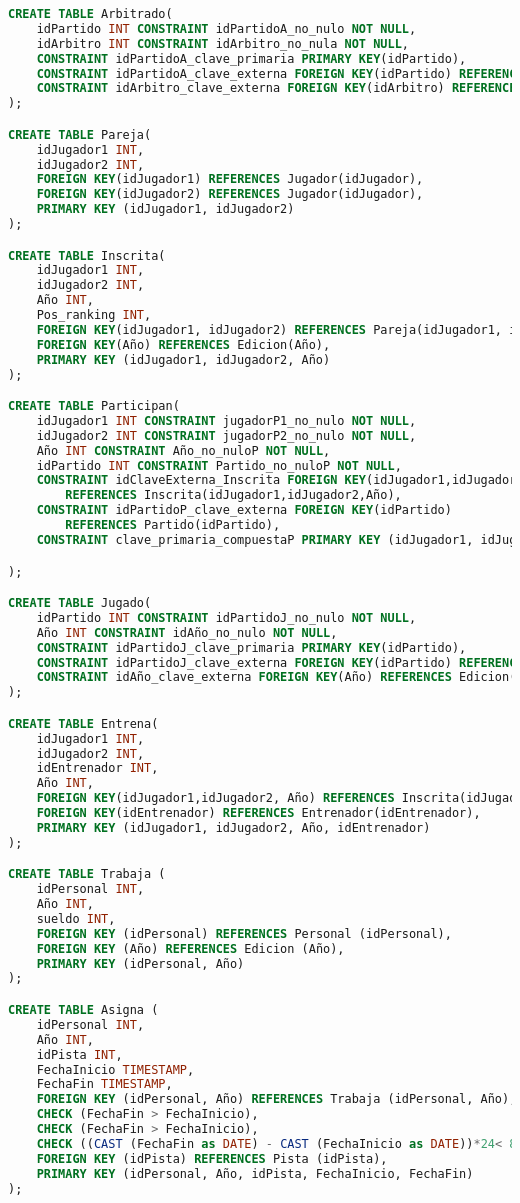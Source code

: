 \begin{lstlisting}[language=sql]
CREATE TABLE Arbitrado(
	idPartido INT CONSTRAINT idPartidoA_no_nulo NOT NULL,
	idArbitro INT CONSTRAINT idArbitro_no_nula NOT NULL,
	CONSTRAINT idPartidoA_clave_primaria PRIMARY KEY(idPartido),
	CONSTRAINT idPartidoA_clave_externa FOREIGN KEY(idPartido) REFERENCES Partido(idPartido),
	CONSTRAINT idArbitro_clave_externa FOREIGN KEY(idArbitro) REFERENCES Arbitro(idArbitro)
);

CREATE TABLE Pareja(
	idJugador1 INT,
	idJugador2 INT,
	FOREIGN KEY(idJugador1) REFERENCES Jugador(idJugador),
	FOREIGN KEY(idJugador2) REFERENCES Jugador(idJugador),
	PRIMARY KEY (idJugador1, idJugador2)
);

CREATE TABLE Inscrita(
	idJugador1 INT,
	idJugador2 INT,
	Año INT,
	Pos_ranking INT,
	FOREIGN KEY(idJugador1, idJugador2) REFERENCES Pareja(idJugador1, idJugador2),
	FOREIGN KEY(Año) REFERENCES Edicion(Año),
	PRIMARY KEY (idJugador1, idJugador2, Año)
);

CREATE TABLE Participan(
	idJugador1 INT CONSTRAINT jugadorP1_no_nulo NOT NULL,
	idJugador2 INT CONSTRAINT jugadorP2_no_nulo NOT NULL,
	Año INT CONSTRAINT Año_no_nuloP NOT NULL,
	idPartido INT CONSTRAINT Partido_no_nuloP NOT NULL,
	CONSTRAINT idClaveExterna_Inscrita FOREIGN KEY(idJugador1,idJugador2,Año)
		REFERENCES Inscrita(idJugador1,idJugador2,Año),
	CONSTRAINT idPartidoP_clave_externa FOREIGN KEY(idPartido)
		REFERENCES Partido(idPartido),
	CONSTRAINT clave_primaria_compuestaP PRIMARY KEY (idJugador1, idJugador2, Año,idPartido)

);

CREATE TABLE Jugado(
	idPartido INT CONSTRAINT idPartidoJ_no_nulo NOT NULL,
	Año INT CONSTRAINT idAño_no_nulo NOT NULL,
	CONSTRAINT idPartidoJ_clave_primaria PRIMARY KEY(idPartido),
	CONSTRAINT idPartidoJ_clave_externa FOREIGN KEY(idPartido) REFERENCES Partido(idPartido),
	CONSTRAINT idAño_clave_externa FOREIGN KEY(Año) REFERENCES Edicion(Año)
);

CREATE TABLE Entrena(
	idJugador1 INT,
	idJugador2 INT,
	idEntrenador INT,
	Año INT,
	FOREIGN KEY(idJugador1,idJugador2, Año) REFERENCES Inscrita(idJugador1,idJugador2, Año),
	FOREIGN KEY(idEntrenador) REFERENCES Entrenador(idEntrenador),
	PRIMARY KEY (idJugador1, idJugador2, Año, idEntrenador)
);

CREATE TABLE Trabaja (
	idPersonal INT,
	Año INT,
	sueldo INT,
	FOREIGN KEY (idPersonal) REFERENCES Personal (idPersonal),
	FOREIGN KEY (Año) REFERENCES Edicion (Año),
	PRIMARY KEY (idPersonal, Año)
);

CREATE TABLE Asigna (
	idPersonal INT,
	Año INT,
	idPista INT,
	FechaInicio TIMESTAMP,
	FechaFin TIMESTAMP,
	FOREIGN KEY (idPersonal, Año) REFERENCES Trabaja (idPersonal, Año),
	CHECK (FechaFin > FechaInicio),
	CHECK (FechaFin > FechaInicio),
	CHECK ((CAST (FechaFin as DATE) - CAST (FechaInicio as DATE))*24< 8),
	FOREIGN KEY (idPista) REFERENCES Pista (idPista),
	PRIMARY KEY (idPersonal, Año, idPista, FechaInicio, FechaFin)
);


\end{lstlisting}
